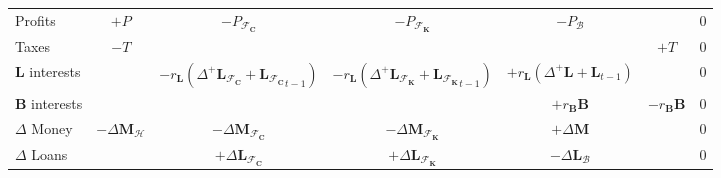 \documentclass[]{article}
\begin{document}
\begin{table}
\begin{tabular}{l|ccccc|l}
        Profits                & $+P$                            & $-P_{\mathcal{F}_\mathbf{C}}$                                                                               & $-P_{\mathcal{F}_\mathbf{K}}$                                                                               & $-P_\mathcal{B}$                                          &                     & 0        \\
        Taxes                  &
        $-T$                   &                                 &                                                                                                             &                                                                                                             & $+T$                                                      & 0                              \\
        \midrule
        $\mathbf{L}$ interests &                                 & $-r_\mathbf{L} (\Delta^+\mathbf{L}_{\mathcal{F}_\mathbf{C}} + {\mathbf{L}_{\mathcal{F}_\mathbf{C}}}_{t-1})$ & $-r_\mathbf{L} (\Delta^+\mathbf{L}_{\mathcal{F}_\mathbf{K}} + {\mathbf{L}_{\mathcal{F}_\mathbf{K}}}_{t-1})$ & $+r_\mathbf{L} (\Delta^+\mathbf{L} + {\mathbf{L}}_{t-1})$ &                     & 0        \\
        $\mathbf{B}$ interests &
                               &                                 &                                                                                                             & $+r_\mathbf{B}\mathbf{B}$                                                                                   & $-r_\mathbf{B}\mathbf{B}$                                 & 0                              \\
        \midrule
        $\Delta$ Money         & $-\Delta\mathbf{M}_\mathcal{H}$ & $-\Delta\mathbf{M}_{\mathcal{F}_\mathbf{C}}$                                                                & $-\Delta\mathbf{M}_{\mathcal{F}_\mathbf{K}}$                                                                & $+\Delta\mathbf{M}$                                       &                     & 0        \\
        $\Delta$ Loans         &                                 & $+\Delta\mathbf{L}_{\mathcal{F}_\mathbf{C}}$                                                                & $+\Delta\mathbf{L}_{\mathcal{F}_\mathbf{K}}$                                                                & $-\Delta\mathbf{L}_{\mathcal{B}}$                         &                     & 0        \\

\end{tabular}
\end{table}
\end{document}
